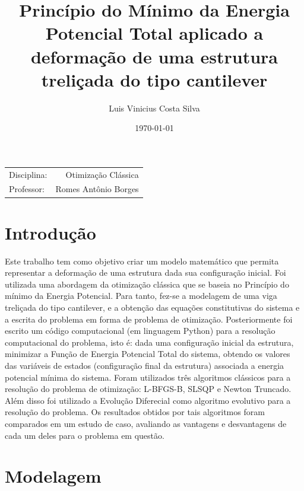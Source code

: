 \documentclass{article}
\title{Princípio do Mínimo da Energia Potencial Total aplicado a deformação de uma estrutura treliçada do tipo cantilever	} %
\author{Luis Vinicius Costa Silva}
\date{\today}
\begin{document}
\maketitle
\nocite{*} 
\begin{center}
\begin{tabular}{l r}
Disciplina: & Otimização Clássica \\
Professor: & Romes Antônio Borges
\end{tabular}
\end{center}

\section{Introdução}
Este trabalho tem como objetivo criar um modelo matemático que permita representar a deformação de uma estrutura dada sua configuração inicial. Foi utilizada uma abordagem da otimização clássica que se baseia no Princípio do mínimo da Energia Potencial. \newline
Para tanto, fez-se a modelagem de uma viga treliçada do tipo cantilever, e a obtenção das equações constitutivas do sistema e a escrita do problema em forma de problema de otimização. Posteriormente foi escrito um código computacional (em linguagem Python) para a resolução computacional do problema, isto é: dada uma configuração inicial da estrutura, minimizar a Função de Energia Potencial Total do sistema, obtendo os valores das variáveis de estados (configuração final da estrutura) associada a energia potencial mínima do sistema.\newline
Foram utilizados três algoritmos clássicos para a resolução do problema de otimização: L-BFGS-B, SLSQP e Newton Truncado. Além disso foi utilizado a Evolução Diferecial como algoritmo evolutivo para a resolução do problema. Os resultados obtidos por tais algoritmos foram comparados em um estudo de caso, avaliando as vantagens e desvantagens de cada um deles para o problema em questão.
\section{Modelagem}
\end{document}
